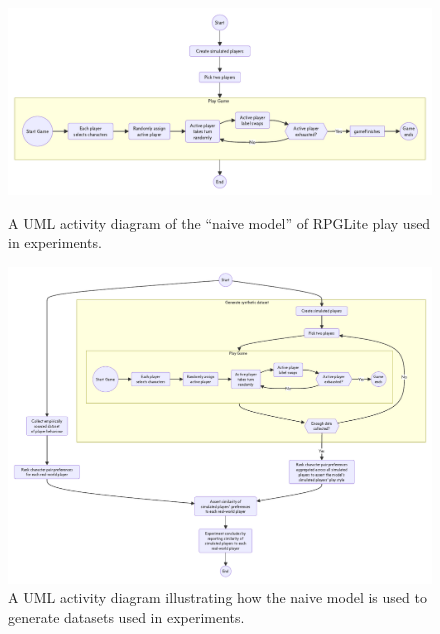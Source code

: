 \begin{figure}[tp]
  \centering
  \includegraphics[width=\columnwidth]{60_optimisation_with_aspects/diagrams/naive_model.pdf}
  \caption{A UML activity diagram of the ``naive model'' of RPGLite play used in experiments.}
  \label{fig:naive_model}
  \medskip
  \includegraphics[width=\columnwidth]{60_optimisation_with_aspects/diagrams/experiment_setup_for_datagen.pdf}
  \caption{A UML activity diagram illustrating how the naive model is used to generate datasets used in experiments.}
  \label{fig:naive_model_with_experimental_apparatus}
\end{figure}

